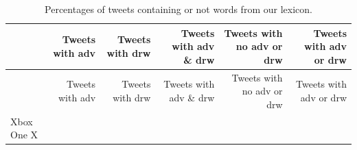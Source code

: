 \documentclass[]{book}
\begin{document}
\begin{longtable}[]{@{}lrrrrr@{}}
\caption{\label{tab:tweetab3} Percentages of tweets containing or not words
from our lexicon.}\tabularnewline
\toprule
\begin{minipage}[b]{0.09\columnwidth}\raggedright\strut
\strut
\end{minipage} & \begin{minipage}[b]{0.12\columnwidth}\raggedleft\strut
Tweets with adv\strut
\end{minipage} & \begin{minipage}[b]{0.12\columnwidth}\raggedleft\strut
Tweets with drw\strut
\end{minipage} & \begin{minipage}[b]{0.16\columnwidth}\raggedleft\strut
Tweets with adv \& drw\strut
\end{minipage} & \begin{minipage}[b]{0.19\columnwidth}\raggedleft\strut
Tweets with no adv or drw\strut
\end{minipage} & \begin{minipage}[b]{0.17\columnwidth}\raggedleft\strut
Tweets with adv or drw\strut
\end{minipage}\tabularnewline
\midrule
\endfirsthead
\toprule
\begin{minipage}[b]{0.09\columnwidth}\raggedright\strut
\strut
\end{minipage} & \begin{minipage}[b]{0.12\columnwidth}\raggedleft\strut
Tweets with adv\strut
\end{minipage} & \begin{minipage}[b]{0.12\columnwidth}\raggedleft\strut
Tweets with drw\strut
\end{minipage} & \begin{minipage}[b]{0.16\columnwidth}\raggedleft\strut
Tweets with adv \& drw\strut
\end{minipage} & \begin{minipage}[b]{0.19\columnwidth}\raggedleft\strut
Tweets with no adv or drw\strut
\end{minipage} & \begin{minipage}[b]{0.17\columnwidth}\raggedleft\strut
Tweets with adv or drw\strut
\end{minipage}\tabularnewline
\midrule
\endhead
\begin{minipage}[t]{0.09\columnwidth}\raggedright\strut
Xbox One X\strut
\end{minipage} & \begin{minipage}[t]{0.12\columnwidth}\raggedleft\strut

\end{minipage}
\end{longtable}
\end{document}
